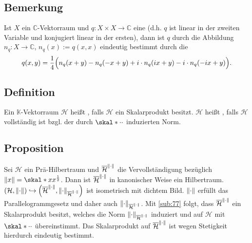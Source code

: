\subsection{Bemerkung} %
\label{sub:78}
Ist $X$ ein $\mathds{C}$-Vektorraum und $q \colon X \times X \to \mathds{C}$ eine  (d.h. $q$ ist linear in der zweiten Variable und konjugiert 
linear in der ersten), dann ist $q$ durch die Abbildung $n_q \colon X \to \mathds{C}$, $n_q(x) := q(x,x)$ eindeutig bestimmt durch die 
\[
	q(x,y) = \frac{1}{4} \enbrace[\Big]{n_q(x+y) - n_q(-x+y) + i \cdot n_q(i x +y) - i \cdot n_q(-ix +y)}.  
\]

\subsection[Definition: Prä-Hilbertraum und Hilbertraum]{Definition} %
\label{sub:79}
Ein $\mathds{K}$-Vektorraum $\mathcal{H}$ heißt , falls $\mathcal{H}$ ein Skalarprodukt besitzt. $\mathcal{H}$ heißt , falls
$\mathcal{H}$ vollständig ist bzgl. der durch $\skal*{\cdot}{\cdot}$ induzierten Norm. 

\subsection{Proposition} %
\label{sub:710}
Sei $\mathcal{H}$ ein Prä-Hilbertraum und $\overline{\mathcal{H}}^{\norm{\cdot}}$ die Vervollständigung bezüglich $\norm{x} = \skal*{x}{x}^{\frac{1}{2}}$. Dann ist
$\overline{\mathcal{H}}^{\norm{\cdot}}$ in kanonischer Weise ein Hilbertraum.
$\enbrace*{\mathcal{H}, \norm{\cdot}} \hookrightarrow \enbrace*{\overline{\mathcal{H}}^{\norm{\cdot}}, \norm[\overline{\mathcal{H}}^{\norm{\cdot}}]{\cdot}}$ ist isometrisch
mit dichtem Bild. $\norm{\cdot}$ erfüllt das Parallelogrammgesetz und daher auch $\norm[\overline{\mathcal{H}}^{\norm{\cdot}}]{\cdot}$. Mit \ref{sub:77} folgt, dass 
$\overline{\mathcal{H}}^{\norm{\cdot}}$ ein Skalarprodukt besitzt, welches die Norm $\norm[\overline{\mathcal{H}}^{\norm{\cdot}}]{\cdot}$ induziert und auf $\mathcal{H}$ mit
$\skal*{\cdot}{\cdot}$ übereinstimmt. Das Skalarprodukt auf $\overline{\mathcal{H}}^{\norm{\cdot}}$ ist wegen Stetigkeit hierdurch eindeutig bestimmt. \bewende

